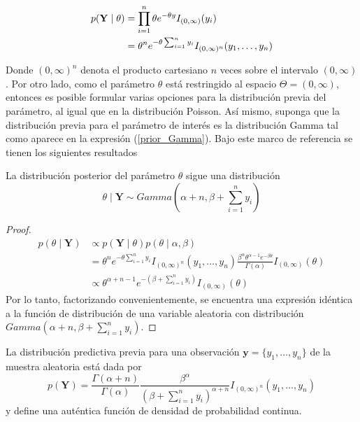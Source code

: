 \documentclass[10pt,openright]{book}\usepackage[]{graphicx}\usepackage[]{color}
\begin{document}
    \begin{align}
    p(\mathbf{Y} \mid \theta)&=\prod_{i=1}^n\theta e^{-\theta y}I_{(0,\infty)}(y_i) \notag \\
    &=\theta^n e^{-\theta \sum_{i=1}^ny_i}I_{(0,\infty)^n}(y_1,\ldots,y_n)
    \end{align}
    
    Donde $(0,\infty)^n$ denota el producto cartesiano $n$ veces sobre el intervalo $(0,\infty)$. Por otro lado, como el par\'ametro $\theta$ est\'a restringido al espacio $\Theta=(0,\infty)$, entonces es posible formular varias opciones para la distribuci\'on previa del par\'ametro, al igual que en la distribuci\'on Poisson. As\'i mismo, suponga que la distribuci\'on previa para el par\'ametro de inter\'es es la distribuci\'on Gamma tal como aparece en la expresi\'on (\ref{prior_Gamma}). Bajo este marco de referencia se tienen los siguientes resultados
    
    \begin{Res}
    La distribuci\'on posterior del par\'ametro $\theta$ sigue una distribuci\'on
    \begin{equation*}
    \theta \mid \mathbf{Y} \sim Gamma\left(\alpha+n,\beta+\sum_{i=1}^ny_i\right)
    \end{equation*}
    \end{Res}
    
    \begin{proof}
    \begin{align*}
    p(\theta \mid \mathbf{Y})&\propto p(\mathbf{Y} \mid \theta)p(\theta \mid \alpha,\beta)\\
    &=\theta^n e^{-\theta \sum_{i=1}^ny_i}I_{(0,\infty)^n}(y_1,\ldots,y_n)\frac{\beta^\alpha \theta^{\alpha-1} e^{-\beta\theta}}{\Gamma(\alpha)}I_{(0,\infty)}(\theta)\\
    &\propto \theta^{\alpha+n-1}e^{-(\beta+\sum_{i=1}^ny_i)}I_{(0,\infty)}(\theta)
    \end{align*}
    Por lo tanto, factorizando convenientemente, se encuentra una expresi\'on id\'entica a la funci\'on de distribuci\'on de una variable aleatoria con distribuci\'on $Gamma(\alpha+n,\beta+\sum_{i=1}^ny_i)$.
    \end{proof}
    
    \begin{Res}\label{predictiva_exponencial}
    La distribuci\'on predictiva previa para una observaci\'on $\mathbf{y}=\{y_1,\ldots,y_n\}$ de la muestra aleatoria est\'a dada por
    \begin{equation}\label{predictiva_exponencial_for}
    p(\mathbf{Y})=\frac{\Gamma(\alpha+n)}{\Gamma(\alpha)}\frac{\beta^\alpha}{(\beta+\sum_{i=1}^ny_i)^{\alpha+n}}
    I_{(0,\infty)^n}(y_1,\ldots,y_n)
    \end{equation}
    y define una aut\'entica funci\'on de densidad de probabilidad continua.
    \end{Res}
    
\end{document}
